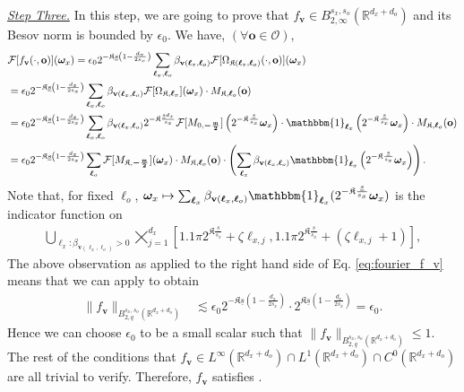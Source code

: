 \documentclass[11pt]{article}
\newcommand{\one}{\mathbbm{1}}
\newcommand{\bv}{\mathbf v}
\newcommand{\bo}{\mathbf o}
\newcommand{\bomega}{\boldsymbol{\omega}}
\newcommand{\calF}{\mathcal{F}}
\newcommand{\calO}{\mathcal{O}}
\newcommand{\bl}{{\boldsymbol\ell}}
\newcommand{\R}{\mathbb{R}}
\newcommand{\0}{\mathbf{0}}
\newcommand{\steve}[1]{#1}
\begin{document}
\begin{appendix}
\vspace{3mm}
\noindent
\underline{\emph{Step Three.}}
In this step, we are going to prove that $f_{\bv}\in B_{2,\infty}^{s_x,s_o}(\mathbb{R}^{d_x+d_o})$ and its Besov norm is bounded by $\epsilon_0$.
We have, $(\forall\bo\in \calO)$, 
\begin{align}\label{eq:fourier_f_v}
    &\calF[f_{\bv}(\cdot,\bo)](\bomega_x) = \epsilon_0 2^{-\mathfrak{K}\underline{s}\left(1 - \frac{d_x}{2s_x}\right)} \sum_{\bl_x,\bl_o}\beta_{\bv(\bl_x,\bl_o)}\calF[\Omega_{\mathfrak{K}(\bl_x,\bl_o)}(\cdot, \bo)](\bomega_x) \nonumber \\ 
    &= \epsilon_0 2^{-\mathfrak{K}\underline{s}\left(1 - \frac{d_x}{2s_x}\right)} \sum_{\bl_x,\bl_o}\beta_{\bv(\bl_x,\bl_o)}\calF[\Omega_{\mathfrak{K},\bl_x}](\bomega_x) \cdot M_{\mathfrak{K},\bl_o}(\bo) \nonumber \\
    &= \epsilon_0 2^{-\mathfrak{K}\underline{s}\left(1 - \frac{d_x}{2s_x}\right)} \sum_{\bl_x, \bl_o} \beta_{\bv(\bl_x,\bl_o)} 2^{-\mathfrak{K}\frac{\underline{s}d_x}{s_x}}\calF[M_{0,\boldsymbol{-\frac{\mathfrak{m}}{2}}}] \left(2^{-\mathfrak{K}\frac{\underline{s}}{s_x}}\bomega_{x}\right) \cdot \one_{\bl_x}\left(2^{-\mathfrak{K}\frac{\underline{s}}{s_x}}\bomega_{x}\right) \cdot M_{\mathfrak{K},\bl_o}(\bo) \nonumber \\
    &= \epsilon_0 2^{-\mathfrak{K}\underline{s}\left(1 - \frac{d_x}{2s_x}\right)} \sum_{\bl_o} \calF[M_{\mathfrak{K},\boldsymbol{-\frac{\mathfrak{m}}{2}}}](\bomega_x) \cdot M_{\mathfrak{K},\bl_o}(\bo) \cdot \left(\sum_{\bl_x}\beta_{\bv(\bl_x,\bl_o)}\one_{\bl_x}\left(2^{-\mathfrak{K}\frac{\underline{s}}{s_x}}\bomega_{x}\right) \right).
\end{align}   
Note that, for fixed $\bl_o$,  $\bomega_x \mapsto \sum_{\bl_x}\beta_{\bv(\bl_x,\bl_o)}\one_{\bl_x}(2^{-\mathfrak{K}\frac{\underline{s}}{s_x}}\bomega_{x})$ is the indicator function on
\begin{align*}
    \bigcup_{\bl_x: \beta_{\bv(\bl_x,\bl_o)}>0} \bigtimes_{j=1}^{d_x}\left[1.1\pi 2^{\mathfrak{K}\frac{\underline{s}}{s_x}} + \zeta \ell_{x,j}, 1.1\pi 2^{\mathfrak{K}\frac{\underline{s}}{s_x}} + (\zeta \ell_{x,j} + 1)\right] ,
\end{align*}
The above observation as applied to the right hand side of Eq. \eqref{eq:fourier_f_v} means that we can apply  to obtain
\begin{align}
\label{eq:f_bv_besov_norm_estimate}
    \|f_{\bv}\|_{B^{s_x,s_o}_{2,q}(\mathbb{R}^{d_x+d_o})} &\lesssim \epsilon_0 2^{-\mathfrak{K}\underline{s}\left(1 - \frac{d_x}{2s_x}\right)} \cdot  2^{\mathfrak{K}\underline{s}\left(1 - \frac{d_x}{2s_x}\right)} = \epsilon_0 .
\end{align}
\steve{Hence we can choose $\epsilon_0$ to be a small scalar such that $\|f_{\bv}\|_{B^{s_x,s_o}_{2,q}(\mathbb{R}^{d_x+d_o})} \leq 1$. The rest of the conditions that $f_{\bv} \in L^\infty(\R^{d_x+d_o}) \cap L^1(\R^{d_x+d_o}) \cap C^0(\R^{d_x+d_o})$ are all trivial to verify. Therefore, $f_{\bv}$ satisfies \Cref{ass:f_ast}. }


\end{appendix}
\end{document}
